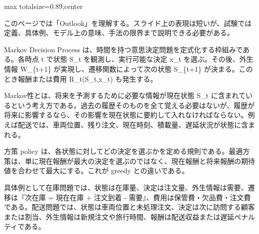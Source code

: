 \begin{minipage}[t]{0.58\textwidth}
\begin{adjustbox}{max totalsize={\textwidth}{0.89\textheight},center}
\begin{minipage}{\textwidth}\scriptsize
{}このページでは「Outlook」を理解する。スライド上の表現は短いが、試験では定義、具体例、モデル上の意味、手法の限界まで説明できる必要がある。\par
Markov Decision Process は、時間を持つ意思決定問題を定式化する枠組みである。各時点 t で状態 S\_t を観測し、実行可能な決定 x\_t を選ぶ。その後、外生情報 W\_\{t+1\} が実現し、遷移関数によって次の状態 S\_\{t+1\} が決まる。このとき報酬または費用 R\_t(S\_t,x\_t) も発生する。\par
Markov性とは、将来を予測するために必要な情報が現在状態 S\_t に含まれているという考え方である。過去の履歴そのものを全て覚える必要はないが、履歴が将来に影響するなら、その影響を現在状態に要約して入れなければならない。例えば配送では、車両位置、残り注文、現在時刻、積載量、遅延状況が状態に含まれる。\par
方策 policy は、各状態に対してどの決定を選ぶかを定める規則である。最適方策は、単に現在報酬が最大の決定を選ぶのではなく、現在報酬と将来報酬の期待値を合わせて最大にする。これが greedy との違いである。\par
具体例として在庫問題では、状態は在庫量、決定は注文量、外生情報は需要、遷移は『次在庫 = 現在在庫 + 注文到着 - 需要』、費用は保管費・欠品費・注文費である。配送問題では、状態は車両位置と未処理注文、決定は次に訪問する顧客または割当、外生情報は新規注文や旅行時間、報酬は配送収益または遅延ペナルティである。\par

\end{minipage}
\end{adjustbox}
\end{minipage}
